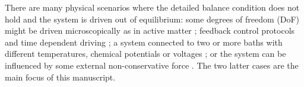 There are many physical scenarios where the detailed balance condition does not hold and the system is driven out of equilibrium: some degrees of freedom (DoF) might be driven microscopically as in active matter \cite{marchetti2013hydrodynamics, bechinger2016active}; feedback control protocols \cite{seifert2012stochastic, sagawa2012nonequilibrium, parrondo2015thermodynamics, goerlich2025experimental} and time dependent driving \cite{jung1993periodically, schmiedl2008efficiency, raz2016mimicking,busiello2018similarities, koyuk2020thermodynamic}; a system connected to two or more baths with different temperatures, chemical potentials or voltages \cite{zia2007probability, derrida2007non}; or the system can be influenced by some external non-conservative force \cite{seifert2012stochastic, sasa2006steady, chernyak2006path}. The two latter cases are the main focus of this manuscript. 

